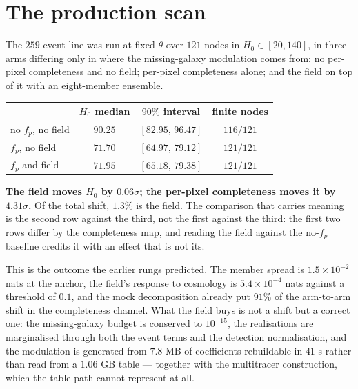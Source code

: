 \documentclass[11pt]{article}
\theoremstyle{definition}
\theoremstyle{remark}
\begin{document}
\section{The production scan}
\label{sec:prodresult}

The $259$-event line was run at fixed $\theta$ over $121$ nodes in
$H_0\in[20,140]$, in three arms differing only in where the missing-galaxy
modulation comes from: no per-pixel completeness and no field; per-pixel
completeness alone; and the field on top of it with an eight-member ensemble.

\begin{center}
\begin{tabular}{lccc}
\toprule
 & $H_0$ median & $90\%$ interval & finite nodes \\
\midrule
no $f_p$, no field & $90.25$ & $[82.95,\,96.47]$ & $116/121$ \\
$f_p$, no field    & $71.70$ & $[64.97,\,79.12]$ & $121/121$ \\
$f_p$ and field    & $71.95$ & $[65.18,\,79.38]$ & $121/121$ \\
\bottomrule
\end{tabular}
\end{center}

\textbf{The field moves $H_0$ by $0.06\sigma$; the per-pixel completeness moves
it by $4.31\sigma$.} Of the total shift, $1.3\%$ is the field. The comparison
that carries meaning is the second row against the third, not the first against
the third: the first two rows differ by the completeness map, and reading the
field against the no-$f_p$ baseline credits it with an effect that is not its.

This is the outcome the earlier rungs predicted. The member spread is
$1.5\times10^{-2}$ nats at the anchor, the field's response to cosmology is
$5.4\times10^{-4}$ nats against a threshold of $0.1$, and the mock decomposition
already put $91\%$ of the arm-to-arm shift in the completeness channel. What the
field buys is not a shift but a correct one: the missing-galaxy budget is
conserved to $10^{-15}$, the realisations are marginalised through both the
event terms and the detection normalisation, and the modulation is generated
from $7.8$ MB of coefficients rebuildable in $41$ s rather than read from a
$1.06$ GB table --- together with the multitracer construction, which the table
path cannot represent at all.
\end{document}
